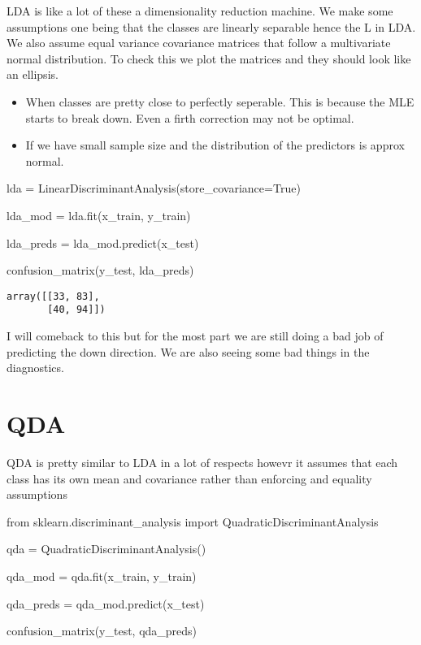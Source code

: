 \documentclass[
  letterpaper,
  DIV=11,
  numbers=noendperiod]{scrreprt}
\newenvironment{Shaded}{\begin{snugshade}}{\end{snugshade}}
\newcommand{\ImportTok}[1]{\textcolor[rgb]{0.00,0.46,0.62}{#1}}
\newcommand{\NormalTok}[1]{\textcolor[rgb]{0.00,0.23,0.31}{#1}}
\newcommand{\OperatorTok}[1]{\textcolor[rgb]{0.37,0.37,0.37}{#1}}
\newcommand{\VariableTok}[1]{\textcolor[rgb]{0.07,0.07,0.07}{#1}}
\begin{document}
LDA is like a lot of these a dimensionality reduction machine. We make
some assumptions one being that the classes are linearly separable hence
the L in LDA. We also assume equal variance covariance matrices that
follow a multivariate normal distribution. To check this we plot the
matrices and they should look like an ellipsis.

\begin{itemize}
\item
  When classes are pretty close to perfectly seperable. This is because
  the MLE starts to break down. Even a firth correction may not be
  optimal.
\item
  If we have small sample size and the distribution of the predictors is
  approx normal.
\end{itemize}

\begin{Shaded}
\begin{Highlighting}[]
\NormalTok{lda }\OperatorTok{=}\NormalTok{ LinearDiscriminantAnalysis(store\_covariance}\OperatorTok{=}\VariableTok{True}\NormalTok{)}

\NormalTok{lda\_mod }\OperatorTok{=}\NormalTok{ lda.fit(x\_train, y\_train)}

\NormalTok{lda\_preds }\OperatorTok{=}\NormalTok{ lda\_mod.predict(x\_test)}

\NormalTok{confusion\_matrix(y\_test, lda\_preds)}
\end{Highlighting}
\end{Shaded}

\begin{verbatim}
array([[33, 83],
       [40, 94]])
\end{verbatim}

I will comeback to this but for the most part we are still doing a bad
job of predicting the down direction. We are also seeing some bad things
in the diagnostics.

\section{QDA}\label{qda}

QDA is pretty similar to LDA in a lot of respects howevr it assumes that
each class has its own mean and covariance rather than enforcing and
equality assumptions

\begin{Shaded}
\begin{Highlighting}[]
\ImportTok{from}\NormalTok{ sklearn.discriminant\_analysis }\ImportTok{import}\NormalTok{ QuadraticDiscriminantAnalysis}

\NormalTok{qda }\OperatorTok{=}\NormalTok{ QuadraticDiscriminantAnalysis()}

\NormalTok{qda\_mod }\OperatorTok{=}\NormalTok{ qda.fit(x\_train, y\_train)}


\NormalTok{qda\_preds }\OperatorTok{=}\NormalTok{ qda\_mod.predict(x\_test)}


\NormalTok{confusion\_matrix(y\_test, qda\_preds)}
\end{Highlighting}
\end{Shaded}
\end{document}

